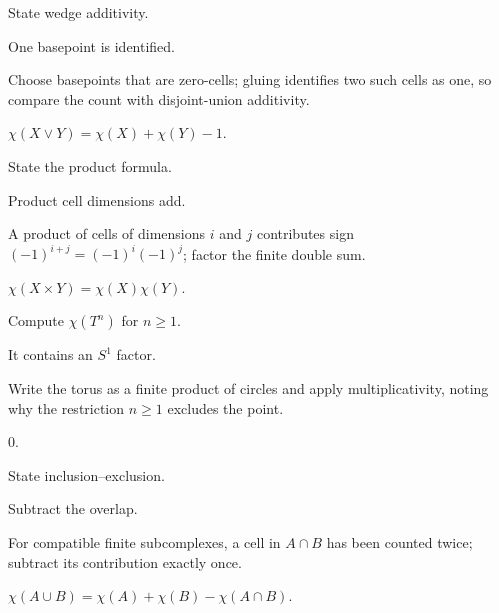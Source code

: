 \begin{exercise}\label{exr:viii21-18}
State wedge additivity.
\end{exercise}
\begin{hint}
One basepoint is identified.

Choose basepoints that are zero-cells; gluing identifies two such cells as one, so compare the count with disjoint-union additivity.
\end{hint}
\begin{solution}
\(\chi(X\vee Y)=\chi(X)+\chi(Y)-1\).
\end{solution}

\begin{exercise}\label{exr:viii21-19}
State the product formula.
\end{exercise}
\begin{hint}
Product cell dimensions add.

A product of cells of dimensions \(i\) and \(j\) contributes sign \((-1)^{i+j}=(-1)^i(-1)^j\); factor the finite double sum.
\end{hint}
\begin{solution}
\(\chi(X\times Y)=\chi(X)\chi(Y)\).
\end{solution}

\begin{exercise}\label{exr:viii21-20}
Compute \(\chi(T^n)\) for \(n\ge1\).
\end{exercise}
\begin{hint}
It contains an \(S^1\) factor.

Write the torus as a finite product of circles and apply multiplicativity, noting why the restriction \(n\ge1\) excludes the point.
\end{hint}
\begin{solution}
\(0\).
\end{solution}

\begin{exercise}\label{exr:viii21-21}
State inclusion--exclusion.
\end{exercise}
\begin{hint}
Subtract the overlap.

For compatible finite subcomplexes, a cell in \(A\cap B\) has been counted twice; subtract its contribution exactly once.
\end{hint}
\begin{solution}
\(\chi(A\cup B)=\chi(A)+\chi(B)-\chi(A\cap B)\).
\end{solution}

